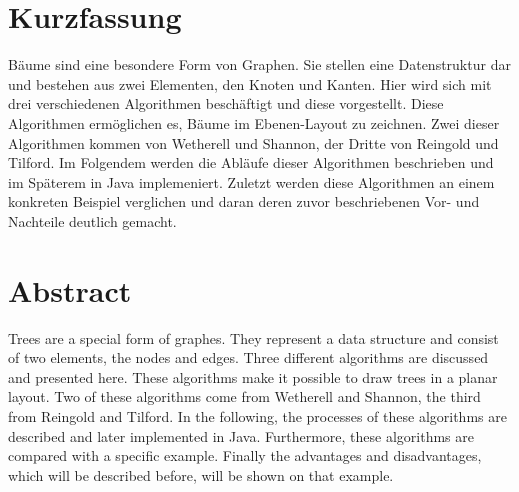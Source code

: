 \section*{Kurzfassung}
Bäume sind eine besondere Form von Graphen. Sie stellen eine Datenstruktur dar und bestehen aus zwei Elementen, 
den Knoten und Kanten. Hier wird sich mit drei verschiedenen Algorithmen beschäftigt und diese vorgestellt. Diese Algorithmen ermöglichen es, 
Bäume im Ebenen-Layout zu zeichnen. Zwei dieser Algorithmen kommen von Wetherell und Shannon, der Dritte von Reingold und Tilford.
Im Folgendem werden die Abläufe dieser Algorithmen beschrieben und im Späterem in Java implemeniert. Zuletzt werden diese Algorithmen 
an einem konkreten Beispiel verglichen und daran deren zuvor beschriebenen Vor- und Nachteile deutlich gemacht.

\vfill\vfill\vfill\vfill\vfill\vfill
\section*{Abstract}
Trees are a special form of graphes. They represent a data structure and consist of two elements,
the nodes and edges. Three different algorithms are discussed and presented here. These algorithms make it possible to
draw trees in a planar layout. Two of these algorithms come from Wetherell and Shannon, the third from Reingold and Tilford.
In the following, the processes of these algorithms are described and later implemented in Java. Furthermore, these algorithms are
compared with a specific example. Finally the advantages and disadvantages, which will be described before, will be shown on that example.
\vfill\vfill\vfill\vfill\vfill\vfill